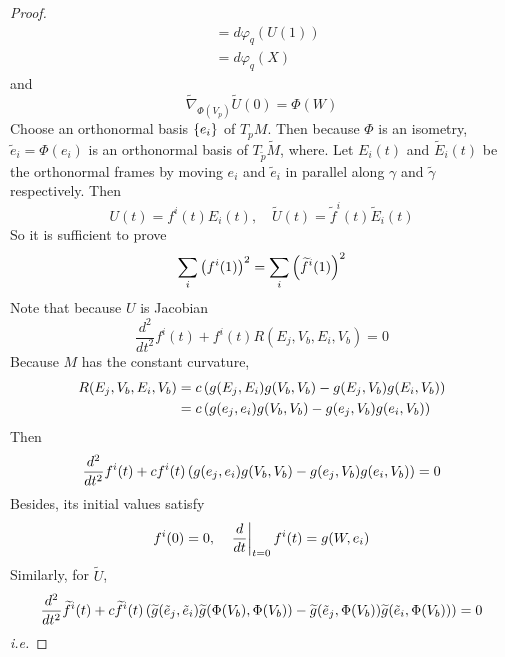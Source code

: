 \begin{enumerate}[label=\arabic{*}.]
\begin{proof}
\begin{equation*}
\begin{aligned}
				&= d\varphi_q(U(1)) \\
				&= d\varphi_q(X)
			\end{aligned}
		\end{equation*}
		and 
		\begin{equation*}
			\widetilde{\nabla}_{\Phi(V_p)}\widetilde{U}(0) = \Phi(W)
		\end{equation*}
		Choose an orthonormal basis $\left\{e_i\right\}$ of $T_pM$. Then because $\Phi$ is an isometry, $\tilde{e}_i=\Phi(e_i)$ is an orthonormal basis of $T_{\tilde{p}}\widetilde{M}$, where. Let $E_i(t)$ and $\widetilde{E}_i(t)$ be the orthonormal frames by moving $e_i$ and $\tilde{e}_i$ in parallel along $\gamma$ and $\widetilde{\gamma}$ respectively. Then
		\begin{equation*}
			U(t) = f^i(t)E_i(t),\quad \widetilde{U}(t) = \widetilde{f}^i(t)\widetilde{E}_i(t)
		\end{equation*}
		So it is sufficient to prove
		\begin{equation*}
			\sum_i \left(f^i(1)\right)^2 = \sum_i \left(\widetilde{f}^i(1)\right)^2
		\end{equation*}
		Note that because $U$ is Jacobian
		\begin{equation*}
			\frac{d^2}{dt^2}f^i(t) + f^i(t)R(E_j,V_b,E_i,V_b) = 0
		\end{equation*}
		Because $M$ has the constant curvature, 
		\begin{equation*}
			\begin{aligned}
				R(E_j,V_b,E_i,V_b) &= c\left(g(E_j,E_i)g(V_b,V_b)-g(E_j,V_b)g(E_i,V_b)\right) \\
				&= c\left(g(e_j,e_i)g(V_b,V_b)-g(e_j,V_b)g(e_i,V_b)\right)
			\end{aligned}
		\end{equation*}
		Then
		\begin{equation*}
			\frac{d^2}{dt^2}f^i(t) + cf^i(t)\left(g(e_j,e_i)g(V_b,V_b)-g(e_j,V_b)g(e_i,V_b)\right) = 0
		\end{equation*}
		Besides, its initial values satisfy
		\begin{equation*}
			f^i(0) = 0,\quad \left.\frac{d}{dt}\right\lvert_{t=0}f^i(t) = g(W,e_i)
		\end{equation*}
		Similarly, for $\widetilde{U}$,
		\begin{equation*}
			\frac{d^2}{dt^2}\widetilde{f}^i(t) + c\widetilde{f}^i(t)\left(\widetilde{g}(\tilde{e}_j,\tilde{e}_i)\widetilde{g}(\Phi(V_b),\Phi(V_b))-\widetilde{g}(\tilde{e}_j,\Phi(V_b))\widetilde{g}(\tilde{e}_i,\Phi(V_b))\right) = 0
		\end{equation*}
		\emph{i.e.}

\end{proof}
\end{enumerate}
